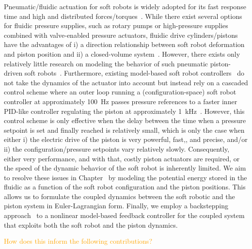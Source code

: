 Pneumatic/fluidic actuation for soft robots is widely adopted for its fast response time and high and distributed forces/torques~\cite{marchese2015recipe, zaidi2021actuation}.
While there exist several options for fluidic pressure supplies, such as rotary pumps or high-pressure supplies combined with valve-enabled pressure actuators, fluidic drive cylinders/pistons~\cite{marchese2014design, marchese2016design, parlikar2024concept, malas2024novel} have the advantages of i) a direction relationship between soft robot deformation and piston position and ii) a closed-volume system~\cite{marchese2016design}.
However, there exists only relatively little research on modeling the behavior of such pneumatic piston-driven soft robots~\cite{marchese2014design, xavier2020modelling}.
Furthermore, existing model-based soft robot controllers~\cite{della2020model, della2023model} do not take the dynamics of the actuator into account but instead rely on a cascaded control scheme where an outer loop running a (configuration-space) soft robot controller at approximately \SI{100}{Hz} passes pressure references to a faster inner PID-like controller regulating the piston at approximately \SI{1}{kHz}~\cite{marchese2014design}.
However, this control scheme is only effective when the delay between the time when a pressure setpoint is set and finally reached is relatively small, which is only the case when either i) the electric drive of the piston is very powerful, fast,, and precise, and/or ii) the configuration/pressure setpoints vary relatively slowly.
Consequently, either very performance, and with that, costly piston actuators are required, or the speed of the dynamic behavior of the soft robot is inherently limited.
We aim to resolve these issues in Chapter~\circled{\ref{chp:backstepping}} by modeling the potential energy stored in the fluidic as a function of the soft robot configuration and the piston positions. This allows us to formulate the coupled dynamics between the soft robotic and the piston system in Euler-Lagrangian form. Finally, we employ a backstepping approach~\cite{kokotovic1992joy, lozano1992adaptive, khalil2002nonlinear} to a nonlinear model-based feedback controller for the coupled system that exploits both the soft robot and the piston dynamics.

\textcolor{orange}{How does this inform the following contributions?}


